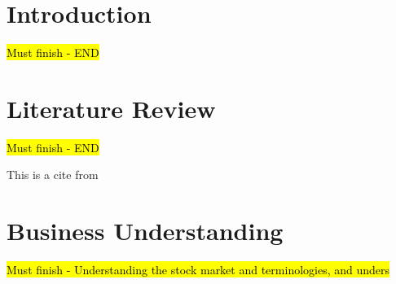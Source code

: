 \documentclass[sigconf, nonacm]{acmart}
\begin{document}
\section{Introduction}
\hl{Must finish - END}

\section{Literature Review}
\hl{Must finish - END}

This is a cite from \cite{8713246}





\section{Business Understanding}
\hl{Must finish - Understanding the stock market and terminologies, and unders}
\end{document}
